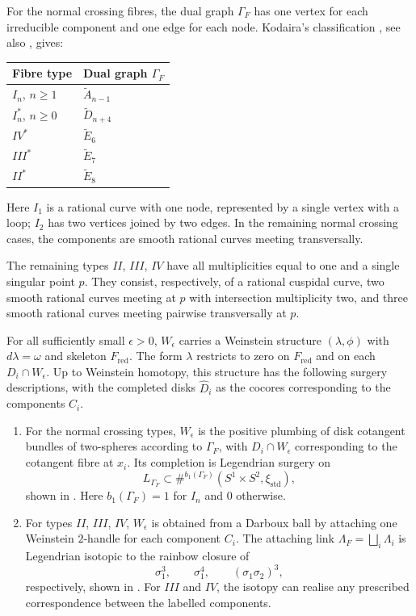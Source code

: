 \documentclass[a4paper]{amsart}
\numberwithin{equation}{section}
\begin{document}
For the normal crossing fibres, the dual graph $\Gamma_F$ has one
vertex for each irreducible component and one edge for each node.
Kodaira's classification \cite{Kodaira63}, see also
\cite[Section~V.7]{BHPV}, gives:
\begin{center}
\begin{tabular}{@{}ll@{}}
\toprule
Fibre type & Dual graph $\Gamma_F$ \\
\midrule
$I_n$, $n\ge1$ & $\widetilde A_{n-1}$ \\
$I_n^*$, $n\ge0$ & $\widetilde D_{n+4}$ \\
$IV^*$ & $\widetilde E_6$ \\
$III^*$ & $\widetilde E_7$ \\
$II^*$ & $\widetilde E_8$ \\
\bottomrule
\end{tabular}
\end{center}
Here $I_1$ is a rational curve with one node, represented by a single
vertex with a loop; $I_2$ has two vertices joined by two edges. In the
remaining normal crossing cases, the components are smooth rational
curves meeting transversally.

The remaining types $II$, $III$, $IV$ have all multiplicities equal to
one and a single singular point $p$. They consist, respectively, of a
rational cuspidal curve, two smooth rational curves meeting at $p$ with
intersection multiplicity two, and three smooth rational curves meeting
pairwise transversally at $p$.

\begin{theorem}\label{thm:neighbourhood-surgery}
For all sufficiently small $\epsilon>0$, $W_\epsilon$ carries a
Weinstein structure $(\lambda,\phi)$ with $d\lambda=\omega$ and
skeleton $F_{\mathrm{red}}$. The form $\lambda$ restricts to zero on
$F_{\mathrm{red}}$ and on each $D_i\cap W_\epsilon$.
Up to Weinstein homotopy, this structure has the following surgery
descriptions, with the completed disks $\widehat D_i$ as the cocores
corresponding to the components $C_i$.
\begin{enumerate}
\item For the normal crossing types, $W_\epsilon$ is the positive
plumbing of disk cotangent bundles of two-spheres according to
$\Gamma_F$, with $D_i\cap W_\epsilon$ corresponding to the cotangent
fibre at $x_i$. Its completion is Legendrian surgery on
\[
 L_{\Gamma_F}\subset
 \#^{b_1(\Gamma_F)}(S^1\times S^2,\xi_{\mathrm{std}}),
\]
shown in .
Here $b_1(\Gamma_F)=1$ for $I_n$ and $0$ otherwise.
\item For types $II$, $III$, $IV$, $W_\epsilon$ is obtained from a
Darboux ball by attaching one Weinstein $2$-handle for each component
$C_i$. The attaching link $\Lambda_F=\bigsqcup_i\Lambda_i$ is
Legendrian isotopic to the rainbow closure of
\[
 \sigma_1^3,\qquad \sigma_1^4,\qquad (\sigma_1\sigma_2)^3,
\]
respectively, shown in . For $III$ and $IV$,
the isotopy can realise any prescribed correspondence between the
labelled components.
\end{enumerate}
\end{theorem}
\end{document}
